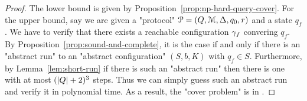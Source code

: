 \thmNPComplete*

\begin{proof}
	The lower bound is given by Proposition~\ref{prop:np-hard-query-cover}.
	For the upper bound, say we are given a "protocol" $\mathcal{P} = (Q, \mathcal{M}, \Delta, q_0, r)$ and a state $q_f$. We have to verify that there exists a reachable configuration $\gamma_f$ convering $q_f$. By Proposition~\ref{prop:sound-and-complete}, it is the case if and only if there is an "abstract run" to an "abstract configuration" $(S,b, K)$ with $q_f \in S$.
	Furthermore, by Lemma~\ref{lem:short-run} if there is such an "abstract run" then there is one with at most $(|Q|+2)^3$ steps. 
	Thus we can simply guess such an abstract run and verify it in polynomial time.
	As a result, the "cover problem" is in \NP. 
\end{proof}